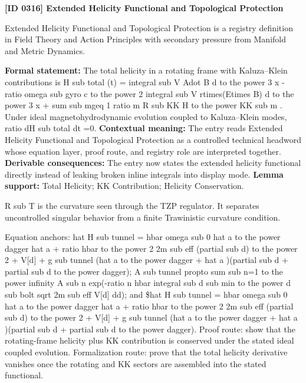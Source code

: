 \clearpage
\noindent\textbf{[ID 0316] Extended Helicity Functional and Topological Protection}\par
\vspace{0.35em}
\begingroup\small
{}
Extended Helicity Functional and Topological Protection is a registry definition in Field Theory and Action Principles with secondary pressure from Manifold and Metric Dynamics.

\begingroup\footnotesize\setlength{\emergencystretch}{3em}\sloppy
\textbf{Formal statement:} The total helicity in a rotating frame with Kaluza--Klein contributions is H sub total (t) = integral sub V Adot B d to the power 3 x - ratio omega sub gyro c to the power 2 integral sub V rtimes(Etimes B) d to the power 3 x + sum sub mgeq 1 ratio m R sub KK H to the power KK sub m . Under ideal magnetohydrodynamic evolution coupled to Kaluza--Klein modes, ratio dH sub total dt =0. \textbf{Contextual meaning:} The entry reads Extended Helicity Functional and Topological Protection as a controlled technical headword whose equation layer, proof route, and registry role are interpreted together. \textbf{Derivable consequences:} The entry now states the extended helicity functional directly instead of leaking broken inline integrals into display mode. \textbf{Lemma support:} Total Helicity; KK Contribution; Helicity Conservation.\par
\endgroup

R sub T is the curvature seen through the TZP regulator. It separates uncontrolled singular behavior from a finite Trawinistic curvature condition.

Equation anchors: hat H sub tunnel = hbar omega sub 0 hat a to the power dagger hat a + ratio hbar to the power 2 2m sub eff (partial sub d) to the power 2 + V[d] + g sub tunnel (hat a to the power dagger + hat a )(partial sub d + partial sub d to the power dagger); A sub tunnel propto sum sub n=1 to the power infinity A sub n exp(-ratio n hbar integral sub d sub min to the power d sub bolt sqrt 2m sub eff V[d] dd); and \$hat H sub tunnel = hbar omega sub 0 hat a to the power dagger hat a + ratio hbar to the power 2 2m sub eff (partial sub d) to the power 2 + V[d] + g sub tunnel (hat a to the power dagger + hat a )(partial sub d + partial sub d to the power dagger). Proof route: show that the rotating-frame helicity plus KK contribution is conserved under the stated ideal coupled evolution. Formalization route: prove that the total helicity derivative vanishes once the rotating and KK sectors are assembled into the stated functional.


